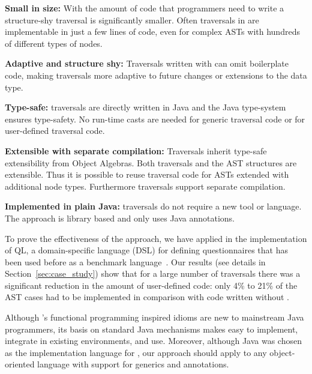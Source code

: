 \begin{itemize*}

\item {\bf Small in size:} With \name the amount of code that
  programmers need to write a structure-shy traversal is significantly smaller.
  Often traversals in \name are implementable in just a few lines
  of code, even for complex ASTs with hundreds of different types of
  nodes.

\item {\bf Adaptive and structure shy:}  Traversals written with \name can omit
  boilerplate code, making traversals more adaptive to
  future changes or extensions to the data type.

\item {\bf Type-safe:} \name traversals are directly written in Java
  and the Java type-system ensures type-safety. No run-time casts are
  needed for generic traversal code or for user-defined traversal
  code.

\item {\bf Extensible with separate compilation:} Traversals inherit type-safe
  extensibility from Object Algebras. Both traversals and the AST structures
  are extensible. Thus it is possible to
  reuse traversal code for ASTs extended with additional
  node types. Furthermore \name traversals support separate compilation.

\item {\bf Implemented in plain Java:} \name traversals do not require
  a new tool or language. The approach is library based and only uses
  Java annotations.


\end{itemize*}

\noindent To prove the effectiveness of the approach, we have applied \name in
the implementation of QL, a domain-specific language (DSL) for defining questionnaires that has been used before as a benchmark language~\cite{gouseti14extensible,erdweg2013state}.  Our results (see details in
Section~\ref{sec:case_study}) show that for a large number of traversals there was a
significant reduction in the amount of user-defined code: only 4\% to
21\% of the AST cases had to be implemented in comparison with code
written without \name.

Although \name's functional programming inspired idioms are new to
mainstream Java programmers, its basis on standard Java
mechanisms makes \name easy to implement, integrate in existing
environments, and use.  Moreover, although Java was chosen as the
implementation language for \Name, our approach should apply to any object-oriented
language with support for generics and annotations.

